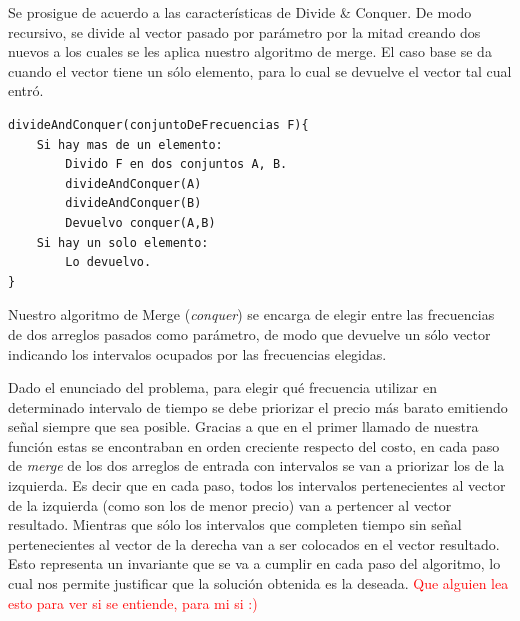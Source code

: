\documentclass[a4paper]{article}
\begin{document}
Se prosigue de acuerdo a las características de Divide \& Conquer. De modo recursivo, se divide al vector pasado por parámetro por la mitad creando dos nuevos a los cuales se les aplica nuestro algoritmo de merge. El caso base se da cuando el vector tiene un sólo elemento, para lo cual se devuelve el vector tal cual entró.

	\begin{codesnippet}
	\begin{verbatim}
divideAndConquer(conjuntoDeFrecuencias F){
    Si hay mas de un elemento:
        Divido F en dos conjuntos A, B.
        divideAndConquer(A)
        divideAndConquer(B)
        Devuelvo conquer(A,B)
    Si hay un solo elemento:
        Lo devuelvo.	
}
	\end{verbatim}
	\end{codesnippet}

Nuestro algoritmo de Merge (\emph{conquer}) se encarga de elegir entre las frecuencias de dos arreglos pasados como parámetro, de modo que devuelve un sólo vector indicando los intervalos ocupados por las frecuencias elegidas. 

Dado el enunciado del problema, para elegir qu\'e frecuencia utilizar en determinado intervalo de tiempo se debe priorizar el precio más barato emitiendo señal siempre que sea posible. Gracias a que en el primer llamado de nuestra funci\'on estas se encontraban en orden creciente respecto del costo, en cada paso de \emph{merge} de los dos arreglos de entrada con intervalos se van a priorizar los de la izquierda. Es decir que en cada paso, todos los intervalos pertenecientes al vector de la izquierda (como son los de menor precio) van a pertencer al vector resultado. Mientras que s\'olo los intervalos que completen tiempo sin se\~nal pertenecientes al vector de la derecha van a ser colocados en el vector resultado. Esto representa un invariante que se va a cumplir en cada paso del algoritmo, lo cual nos permite justificar que la soluci\'on obtenida es la deseada. \textcolor{red}{Que alguien lea esto para ver si se entiende, para mi si :)}\\
\end{document}
